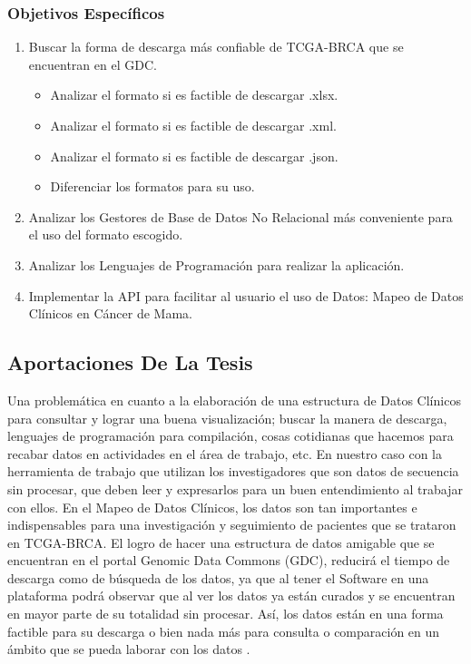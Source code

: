 \documentclass[10pt,a4paper]{article}
\begin{document}
\subsubsection{Objetivos Espec\'ificos}

\begin{enumerate}
\item Buscar la forma de descarga más confiable de TCGA-BRCA que se encuentran en el GDC.

\begin{itemize}

\item Analizar el formato si es factible de descargar .xlsx.  
\item Analizar el formato si es factible de descargar .xml.  
\item Analizar el formato si es factible de descargar .json.
\item Diferenciar los formatos para su uso.

\end{itemize}

\item Analizar los Gestores de Base de Datos No Relacional m\'as conveniente para el uso del formato escogido.

\item Analizar los Lenguajes de Programaci\'on para realizar la aplicaci\'on.

\item Implementar la API para facilitar al usuario el uso de Datos: Mapeo de Datos Cl\'inicos en C\'ancer de Mama.

\end{enumerate}



\subsection{Aportaciones De La Tesis}

Una problem\'atica en cuanto a la elaboraci\'on de una estructura de Datos Cl\'inicos para consultar y lograr una buena visualizaci\'on; buscar la manera de descarga, lenguajes de programaci\'on para compilaci\'on, cosas cotidianas que hacemos para recabar datos en actividades en el \'area de trabajo, etc. En nuestro caso con la herramienta de trabajo que utilizan los investigadores que son datos de secuencia sin procesar, que deben leer y expresarlos para un buen entendimiento al trabajar con ellos. En el Mapeo de Datos Cl\'inicos, los datos son tan importantes e indispensables para una investigaci\'on y seguimiento de pacientes que se trataron en TCGA-BRCA. El logro de hacer una estructura de datos amigable que se encuentran en el portal Genomic Data Commons (GDC), reducir\'a el tiempo de descarga como de b\'usqueda de los datos, ya que al tener el Software en una plataforma podr\'a observar que al ver los datos ya est\'an curados y se encuentran en mayor parte de su totalidad sin procesar. As\'i, los datos est\'an en una forma factible para su descarga o bien nada m\'as para consulta o comparaci\'on en un \'ambito que se pueda laborar con los datos \cite{cerami2012cbio}. 
\end{document}
